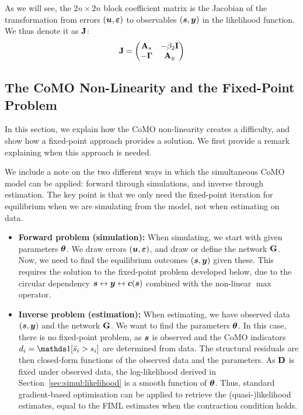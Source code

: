 As we will see, the $2n \times 2n$ block coefficient matrix is the Jacobian of the transformation from errors $(\bm{u}, \bm{\varepsilon})$ to observables $(\bm{s}, \bm{y})$ in the likelihood function. We thus denote it as $\mathbf{J}$:
\begin{equation}
\label{eq:jacobian_matrix}
    \mathbf{J} = \begin{pmatrix}
        \mathbf{A}_s & -\beta_2\mathbf{I} \\
        -\mathbf{\Gamma} & \mathbf{A}_y
    \end{pmatrix}
\end{equation}

\subsection{The CoMO Non-Linearity and the Fixed-Point Problem}
\label{sec:simul:como_challenge}
In this section, we explain how the CoMO non-linearity creates a difficulty, and show how a fixed-point approach provides a solution. We first provide a remark explaining when this approach is needed.

\begin{remark}
\label{rem:forward_vs_inverse}
We include a note on the two different ways in which the simultaneous CoMO model can be applied: forward through simulations, and inverse through estimation. The key point is that we only need the fixed-point iteration for equilibrium when we are simulating from the model, not when estimating on data.
\begin{itemize}
    \item \textbf{Forward problem (simulation):} When simulating, we start with given parameters $\bm{\theta}$. We draw errors $(\bm{u}, \bm{\varepsilon})$, and draw or define the network $\mathbf{G}$. Now, we need to find the equilibrium outcomes $(\bm{s}, \bm{y})$ given these. This requires the solution to the fixed-point problem developed below, due to the circular dependency $\bm{s} \leftrightarrow \bm{y} \leftrightarrow \bm{c}(\bm{s})$ combined with the non-linear $\max$ operator.
    \item \textbf{Inverse problem (estimation):} When estimating, we have observed data $(\bm{s}, \bm{y})$ and the network $\mathbf{G}$. We want to find the parameters $\bm{\theta}$. In this case, there is no fixed-point problem, as $\bm{s}$ is observed and the CoMO indicators $d_i = \one[\sbar_i > s_i]$ are determined from data. The structural residuals are then closed-form functions of the observed data and the parameters. As $\mathbf{D}$ is fixed under observed data, the log-likelihood derived in Section~\ref{sec:simul:likelihood} is a smooth function of $\bm{\theta}$. Thus, standard gradient-based optimisation can be applied to retrieve the (quasi-)likelihood estimates, equal to the FIML estimates when the contraction condition holds.
\end{itemize}
\end{remark}

